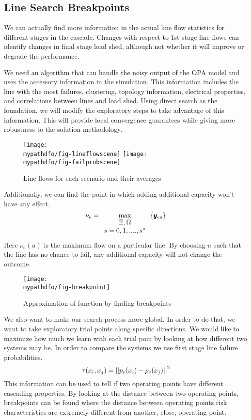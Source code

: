 \subsection{Line Search Breakpoints}

We can actually find more information in the actual line flow statistics for different stages in the cascade.  Changes with respect to 1st stage line flows can identify changes in final stage load shed, although not whether it will improve or degrade the performance.


We need an algorithm that can handle the noisy output of the OPA model and uses the accessory information in the simulation.  This information includes the line with the most failures, clustering, topology information, electrical properties, and correlations between lines and load shed. Using direct search as the foundation, we will modify the exploratory steps to take advantage of this information.  This will provide local convergence guarantees while giving more robustness to the solution methodology.


\begin{figure}
\centering
\texttt{[image: \\mypathdfo/fig-lineflowscene]}
\texttt{[image: \\mypathdfo/fig-failprobscene]}
 \caption{Line flows for each scenario and  their averages}
\label{fig:flows}
\end{figure}


Additionally, we can find the point in which adding additional capacity won't have any effect.  
\begin{equation}
\nu_e = \max_{\begin{array}{c}\Xi,\Omega\\s=0,1,....,s^*\end{array}} \left\{ \pmb{y}_{es} \right\}
\end{equation}
Here $\nu_e (u)$ is the maximum flow on a particular line.  By choosing $u$ such that the line has no chance to fail, any additional capacity will not change the outcome.



\begin{figure}
\centering
\texttt{[image: \\mypathdfo/fig-breakpoint]}
  \caption{Approximation of function by finding breakpoints}
\label{fig:break}
\end{figure}

We also want to make our search process more global.  In order to do that, we want to take exploratory trial points along specific directions.  We would like to maximize how much we learn with each trial poin by looking at how different two systems may be.  In order to compare the systems we use first stage line failure probabilities.
\begin{equation}
\tau (x_i, x_j) = \left| \left| { p_e(x_i) - p_e(x_j) } \right| \right|^2
\end{equation}
This information can be used to tell if two operating points have different cascading properties.  By looking at the distance between two operating points, breakpoints can be found where the distance between operating points risk characteristics are extremely different from another, close, operating point.







